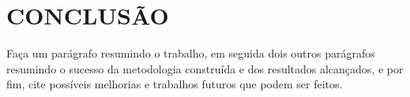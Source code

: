 \chapter{CONCLUSÃO}\label{chp:CONCLUSAO}

Faça um parágrafo resumindo o trabalho, em seguida dois outros parágrafos resumindo o sucesso da metodologia construída e dos resultados alcançados, e por fim, cite possíveis melhorias e trabalhos futuros que podem ser feitos.
